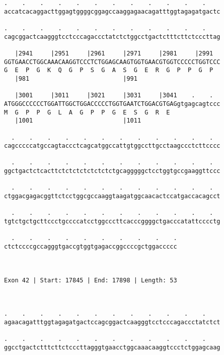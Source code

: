 \documentclass{article}
\begin{document}
\begin{Verbatim}
.    .    .    .    .    .    .    .    .    .    .    .    
accatcacaggacttggagtggggcggagccaaggagaacagatttggtagagatgactc
                                                            
.    .    .    .    .    .    .    .    .    .    .    .    
cagcggactcaagggtcctcccagaccctatctctggcctgactctttcttctcccttag
                                                            
   |2941     |2951     |2961     |2971     |2981     |2991  
GGTGAACCTGGCAAACAAGGTCCCTCTGGAGCAAGTGGTGAACGTGGTCCCCCTGGTCCC
G  E  P  G  K  Q  G  P  S  G  A  S  G  E  R  G  P  P  G  P  
   |981                          |991                       
  
   |3001     |3011     |3021     |3031     |3041    .    .  
ATGGGCCCCCCTGGATTGGCTGGACCCCCTGGTGAATCTGGACGTGAGgtgagcagtccc
M  G  P  P  G  L  A  G  P  P  G  E  S  G  R  E              
   |1001                         |1011                      
  
  .    .    .    .    .    .    .    .    .    .    .    .  
cagcccccatgccagtaccctcagcatggccattgtggccttgcctaagccctcttcccc
                                                            
  .    .    .    .    .    .    .    .    .    .    .    .  
ggctgactctcacttctctctctctctctctgcagggggctcctggtgccgaaggttccc
                                                            
  .    .    .    .    .    .    .    .    .    .    .    .  
ctggacgagacggttctcctggcgccaaggtaagatggcaacactccatgaccacagcct
                                                            
  .    .    .    .    .    .    .    .    .    .    .    .  
tgtctgctgcttccctgccccatcctggcccttcacccggggctgacccatattcccctg
                                                            
  .    .    .    .    .    .    .    .    .    .
ctctccccgccagggtgaccgtggtgagaccggccccgctggaccccc
                                                
                                                
 
Exon 42 | Start: 17845 | End: 17898 | Length: 53



.    .    .    .    .    .    .    .    .    .    .    .    
agaacagatttggtagagatgactccagcggactcaagggtcctcccagaccctatctct
                                                            
.    .    .    .    .    .    .    .    .    .    .    .    
ggcctgactctttcttctcccttagggtgaacctggcaaacaaggtccctctggagcaag
                                                            

\end{Verbatim}
\end{document}
